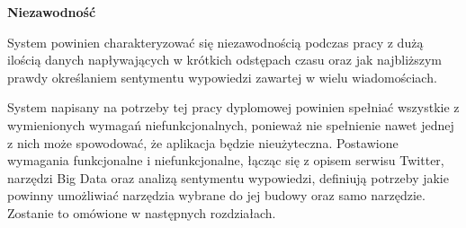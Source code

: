 \textbf{Niezawodność}

System powinien charakteryzować się niezawodnością podczas pracy z dużą ilością danych napływających w krótkich odstępach czasu oraz jak najbliższym prawdy określaniem sentymentu wypowiedzi zawartej w wielu wiadomościach.

System napisany na potrzeby tej pracy dyplomowej powinien spełniać wszystkie z wymienionych wymagań niefunkcjonalnych, ponieważ nie spełnienie nawet jednej z nich może spowodować, że aplikacja będzie nieużyteczna. Postawione wymagania funkcjonalne i niefunkcjonalne, łącząc się z opisem serwisu Twitter, narzędzi Big Data oraz analizą sentymentu wypowiedzi, definiują potrzeby jakie powinny umożliwiać narzędzia wybrane do jej budowy oraz samo narzędzie. Zostanie to omówione w następnych rozdziałach.

